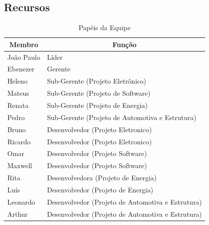 \subsection{Recursos}

\begin{table}[h!]
\centering
\caption{Papéis da Equipe}
\label{papeisDaEquipe}
\begin{tabular}{|l|l|}
\hline
\multicolumn{1}{|c|}{\textbf{Membro}} & \multicolumn{1}{c|}{\textbf{Função}}              \\ \hline
João Paulo                            & Líder                                             \\ \hline
Ebenezer                              & Gerente                                           \\ \hline
Heleno                                & Sub-Gerente (Projeto Eletrônico)                  \\ \hline
Mateus                                & Sub-Gerente (Projeto de Software)                 \\ \hline
Renata                                & Sub-Gerente (Projeto de Energia)                  \\ \hline
Pedro                                 & Sub-Gerente (Projeto de Automotiva e Estrutura)   \\ \hline
Bruno                                 & Desenvolvedor (Projeto Eletronico)                \\ \hline
Ricardo                               & Desenvolvedor (Projeto Eletronico)                \\ \hline
Omar                                  & Desenvolvedor (Projeto Software)                  \\ \hline
Maxwell                               & Desenvolvedor (Projeto Software)                  \\ \hline
Rita                                  & Desenvolvedora (Projeto de Energia)               \\ \hline
Luís                                  & Desenvolvedor (Projeto de Energia)                \\ \hline
Leonardo                              & Desenvolvedor (Projeto de Automotiva e Estrutura) \\ \hline
Arthur                                & Desenvolvedor (Projeto de Automotiva e Estrutura) \\ \hline
\end{tabular}
\end{table}

